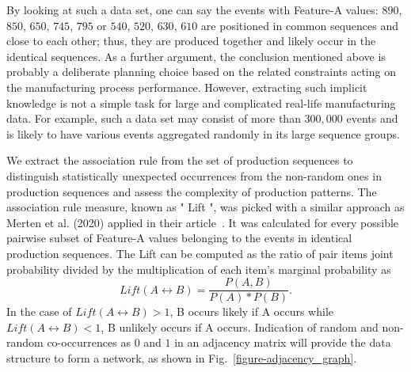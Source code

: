 By looking at such a data set, one can say the events with Feature-A values: $890$, $850$, $650$, $745$, $795$ or $540$, $520$, $630$, $610$ are positioned in common sequences and close to each other; thus, they are produced together and likely occur in the identical sequences. As a further argument, the conclusion mentioned above is probably a deliberate planning choice based on the related constraints acting on the manufacturing process performance. However, extracting such implicit knowledge is not a simple task for large and complicated real-life manufacturing data. For example, such a data set may consist of more than $300,000$ events and is likely to have various events aggregated randomly in its large sequence groups.

We extract the association rule from the set of production sequences to distinguish statistically unexpected occurrences from the non-random ones in production sequences and assess the complexity of production patterns. The association rule measure, known as " Lift ", was picked with a similar approach as Merten et al. (2020) applied in their article~\cite{MERTEN2020}. It was calculated for every possible pairwise subset of Feature-A values belonging to the events in identical production sequences. The Lift can be computed as the ratio of pair items joint probability divided by the multiplication of each item's marginal probability as
\begin{equation} %
	Lift(A\leftrightarrow B)=\frac{P(A,B)}{P(A)*P(B)}.
	\label{lift}
\end{equation}
In the case of $Lift(A\leftrightarrow B)> 1$, B occurs likely if A occurs while $Lift(A\leftrightarrow B)< 1$, B unlikely occurs if A occurs. Indication of random and non-random co-occurrences as $0$ and $1$ in an adjacency matrix will provide the data structure to form a network, as shown in Fig.~\ref{figure-adjacency_graph}.

